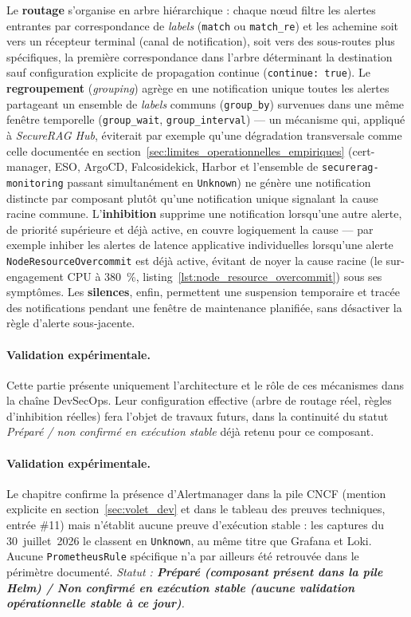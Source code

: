 Le \textbf{routage} s'organise en arbre hiérarchique : chaque nœud filtre les alertes entrantes par correspondance de \textit{labels} (\texttt{match} ou \texttt{match\_re}) et les achemine soit vers un récepteur terminal (canal de notification), soit vers des sous-routes plus spécifiques, la première correspondance dans l'arbre déterminant la destination sauf configuration explicite de propagation continue (\texttt{continue: true}). Le \textbf{regroupement} (\textit{grouping}) agrège en une notification unique toutes les alertes partageant un ensemble de \textit{labels} communs (\texttt{group\_by}) survenues dans une même fenêtre temporelle (\texttt{group\_wait}, \texttt{group\_interval}) — un mécanisme qui, appliqué à \textit{SecureRAG Hub}, éviterait par exemple qu'une dégradation transversale comme celle documentée en section~\ref{sec:limites_operationnelles_empiriques} (cert-manager, ESO, ArgoCD, Falcosidekick, Harbor et l'ensemble de \texttt{securerag-monitoring} passant simultanément en \texttt{Unknown}) ne génère une notification distincte par composant plutôt qu'une notification unique signalant la cause racine commune. L'\textbf{inhibition} supprime une notification lorsqu'une autre alerte, de priorité supérieure et déjà active, en couvre logiquement la cause — par exemple inhiber les alertes de latence applicative individuelles lorsqu'une alerte \texttt{NodeResourceOvercommit} est déjà active, évitant de noyer la cause racine (le sur-engagement CPU à 380~\%, listing~\ref{lst:node_resource_overcommit}) sous ses symptômes. Les \textbf{silences}, enfin, permettent une suspension temporaire et tracée des notifications pendant une fenêtre de maintenance planifiée, sans désactiver la règle d'alerte sous-jacente.

\paragraph{Validation expérimentale.} Cette partie présente uniquement l'architecture et le rôle de ces mécanismes dans la chaîne DevSecOps. Leur configuration effective (arbre de routage réel, règles d'inhibition réelles) fera l'objet de travaux futurs, dans la continuité du statut \textit{Préparé / non confirmé en exécution stable} déjà retenu pour ce composant.

\paragraph{Validation expérimentale.}
Le chapitre confirme la présence d'Alertmanager dans la pile CNCF (mention explicite en section~\ref{sec:volet_dev} et dans le tableau des preuves techniques, entrée \#11) mais n'établit aucune preuve d'exécution stable : les captures du 30~juillet~2026 le classent en \texttt{Unknown}, au même titre que Grafana et Loki. Aucune \texttt{PrometheusRule} spécifique n'a par ailleurs été retrouvée dans le périmètre documenté. \textit{Statut : \textbf{Préparé (composant présent dans la pile Helm) / Non confirmé en exécution stable (aucune validation opérationnelle stable à ce jour)}.}

